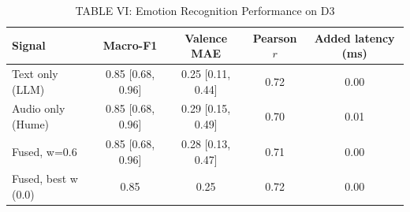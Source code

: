 \begin{table}[t]
\centering
\caption{TABLE VI: Emotion Recognition Performance on D3}
\label{tab:emotion_recognition}
\begin{tabular}{lcccc}
\toprule
Signal & Macro-F1 & Valence MAE & Pearson $r$ & Added latency (ms) \\
\midrule
Text only (LLM) & 0.85 [0.68, 0.96] & 0.25 [0.11, 0.44] & 0.72 & 0.00 \\
Audio only (Hume) & 0.85 [0.68, 0.96] & 0.29 [0.15, 0.49] & 0.70 & 0.01 \\
Fused, w=0.6 & 0.85 [0.68, 0.96] & 0.28 [0.13, 0.47] & 0.71 & 0.00 \\
Fused, best w (0.0) & 0.85 & 0.25 & 0.72 & 0.00 \\
\bottomrule
\end{tabular}
\end{table}